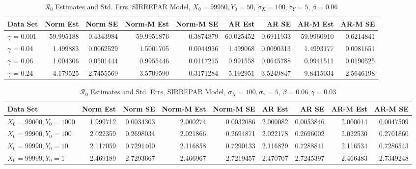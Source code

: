 \message{ !name(draft_v13.tex)}\documentclass[12pt]{article}
\newcommand{\rr}{\ensuremath{\mathcal{R}_0}}
\begin{document}
\begin{table}[H]
	
	\caption{\label{tab:}$\rr$ Estimates and Std. Errs, SIRREPAR Model,
		$X_0 = 99950, Y_0 = 50$, $\sigma_X = 100, \sigma_Y = 5$, $\beta = 0.06$}
	\centering
	\begin{footnotesize}
		\begin{tabular}[t]{l|r|r|r|r|r|r|r|r}
			\hline
			Data Set & Norm Est & Norm SE & Norm-M Est & Norm-M SE & AR Est & AR SE & AR-M Est & AR-M SE\\
			\hline
			$\gamma$ = 0.001 & 59.995188 & 0.4343984 & 59.9951876 & 0.3874879 & 60.025452 & 0.6911933 & 59.9960910 & 0.6214841\\
			\hline
			$\gamma$ = 0.04 & 1.499883 & 0.0062529 & 1.5001705 & 0.0044936 & 1.499068 & 0.0090313 & 1.4993177 & 0.0081651\\
			\hline
			$\gamma$ = 0.06 & 1.004306 & 0.0501444 & 0.9955446 & 0.0117215 & 0.991558 & 0.0645788 & 0.9941511 & 0.0190525\\
			\hline
			$\gamma$ = 0.24 & 4.179525 & 2.7455569 & 3.5709590 & 0.3171284 & 5.192951 & 3.5249847 & 9.8415034 & 2.5646198\\
			\hline
		\end{tabular}
	\end{footnotesize}
\end{table}

\begin{table}[H]
	
	\caption{\label{tab:}$\rr$ Estimates and Std. Errs, SIRREPAR Model,
		$\sigma_X = 100, \sigma_Y = 5$, $\beta = 0.06, \gamma = 0.03$}
	\centering
	\begin{footnotesize}
		\begin{tabular}[t]{l|r|r|r|r|r|r|r|r}
			\hline
			Data Set & Norm Est & Norm SE & Norm-M Est & Norm-M SE & AR Est & AR SE & AR-M Est & AR-M SE\\
			\hline
			$X_0 = 99000, Y_0 = 1000$ & 1.999712 & 0.0034303 & 2.000274 & 0.0032086 & 2.000082 & 0.0053846 & 2.000014 & 0.0047509\\
			\hline
			$X_0 = 99900, Y_0 = 100$ & 2.022359 & 0.2698034 & 2.021866 & 0.2694871 & 2.022178 & 0.2696002 & 2.022530 & 0.2701860\\
			\hline
			$X_0 = 99990, Y_0 = 10$ & 2.117059 & 0.7291460 & 2.116858 & 0.7290133 & 2.116829 & 0.7288841 & 2.116534 & 0.7286543\\
			\hline
			$X_0 = 99999, Y_0 = 1$  & 2.469189 & 2.7293667 & 2.466967 & 2.7219457 & 2.470707 & 2.7245397 & 2.466483 & 2.7349248\\
			\hline
		\end{tabular}
	\end{footnotesize}
\end{table}
\end{document}
